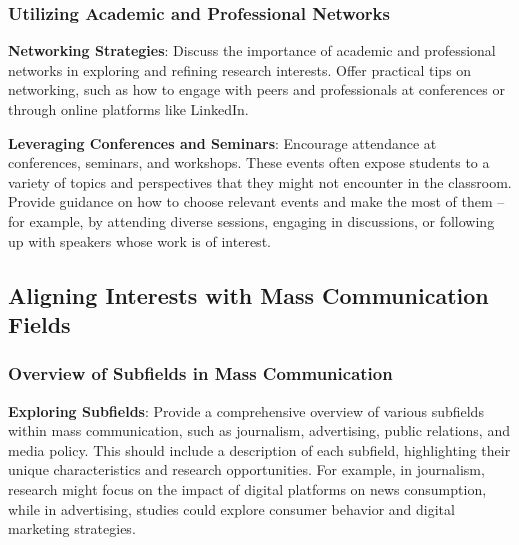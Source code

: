 \documentclass[
]{book}
\begin{document}
\hypertarget{utilizing-academic-and-professional-networks}{%
\subsubsection*{Utilizing Academic and Professional Networks}\label{utilizing-academic-and-professional-networks}}

\textbf{Networking Strategies}: Discuss the importance of academic and professional networks in exploring and refining research interests. Offer practical tips on networking, such as how to engage with peers and professionals at conferences or through online platforms like LinkedIn.

\textbf{Leveraging Conferences and Seminars}: Encourage attendance at conferences, seminars, and workshops. These events often expose students to a variety of topics and perspectives that they might not encounter in the classroom. Provide guidance on how to choose relevant events and make the most of them -- for example, by attending diverse sessions, engaging in discussions, or following up with speakers whose work is of interest.

\hypertarget{aligning-interests-with-mass-communication-fields}{%
\subsection*{Aligning Interests with Mass Communication Fields}\label{aligning-interests-with-mass-communication-fields}}

\hypertarget{overview-of-subfields-in-mass-communication}{%
\subsubsection*{Overview of Subfields in Mass Communication}\label{overview-of-subfields-in-mass-communication}}

\textbf{Exploring Subfields}: Provide a comprehensive overview of various subfields within mass communication, such as journalism, advertising, public relations, and media policy. This should include a description of each subfield, highlighting their unique characteristics and research opportunities. For example, in journalism, research might focus on the impact of digital platforms on news consumption, while in advertising, studies could explore consumer behavior and digital marketing strategies.
\end{document}
